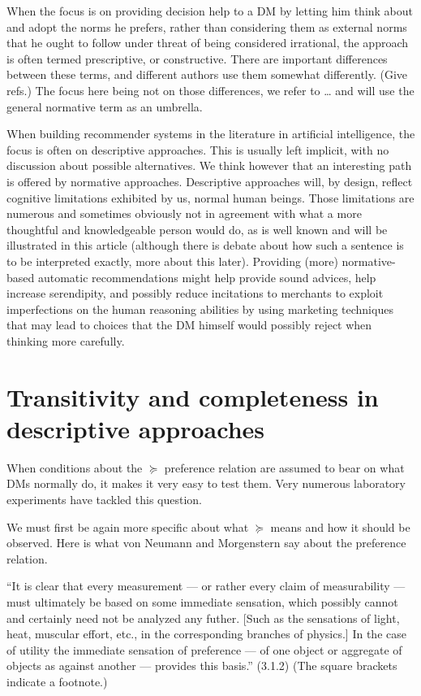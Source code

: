 \documentclass[french, english]{llncs}
\begin{document}
When the focus is on providing decision help to a \ac{DM} by letting him think about and adopt the norms he prefers, rather than considering them as external norms that he ought to follow under threat of being considered irrational, the approach is often termed prescriptive, or constructive. There are important differences between these terms, and different authors use them somewhat differently. (Give refs.) The focus here being not on those differences, we refer to … and will use the general normative term as an umbrella.

When building recommender systems in the literature in artificial intelligence, the focus is often on descriptive approaches. This is usually left implicit, with no discussion about possible alternatives. We think however that an interesting path is offered by normative approaches. Descriptive approaches will, by design, reflect cognitive limitations exhibited by us, normal human beings. Those limitations are numerous and sometimes obviously not in agreement with what a more thoughtful and knowledgeable person would do, as is well known and will be illustrated in this article (although there is debate about how such a sentence is to be interpreted exactly, more about this later). Providing (more) normative-based automatic recommendations might help provide sound advices, help increase serendipity, and possibly reduce incitations to merchants to exploit imperfections on the human reasoning abilities by using marketing techniques that may lead to choices that the \ac{DM} himself would possibly reject when thinking more carefully. 

\section{Transitivity and completeness in descriptive approaches}
When conditions about the $\succeq$ preference relation are assumed to bear on what \acp{DM} normally do, it makes it very easy to test them. Very numerous laboratory experiments have tackled this question.

We must first be again more specific about what $\succeq$ means and how it should be observed. Here is what von Neumann and Morgenstern say about the preference relation.

“It is clear that every measurement --- or rather every claim of measurability --- must ultimately be based on some immediate sensation, which possibly cannot and certainly need not be analyzed any futher.
[Such as the sensations of light, heat, muscular effort, etc., in the corresponding branches of physics.] 
In the case of utility the immediate sensation of preference --- of one object or aggregate of objects as against another --- provides this basis.” (3.1.2) (The square brackets indicate a footnote.)
\end{document}
